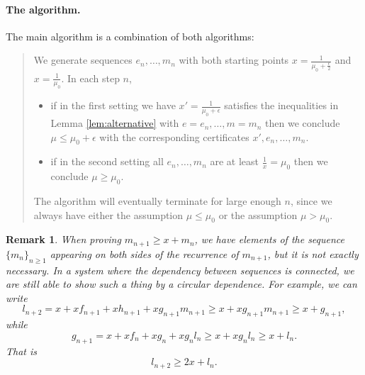 \documentclass[a4paper,12pt]{article}
\newtheorem{remark}{Remark}
\begin{document}
\paragraph{The algorithm.}The main algorithm is a combination of both algorithms:
\begin{quote}
We generate sequences $e_n,\dots,m_n$ with both starting points $x=\frac{1}{\mu_0+\frac{\epsilon}{2}}$ and $x=\frac{1}{\mu_0}$. In each step $n$,
\begin{itemize}
    \item if in the first setting we have $x'=\frac{1}{\mu_0+\epsilon}$ satisfies the inequalities in Lemma \ref{lem:alternative} with $e=e_n,\dots,m=m_n$ then we conclude $\mu\le \mu_0+\epsilon$ with the corresponding certificates $x',e_n,\dots,m_n$.
    \item if in the second setting all $e_n,\dots,m_n$ are at least $\frac{1}{x} = \mu_0$ then we conclude $\mu\ge \mu_0$.
\end{itemize}
The algorithm will eventually terminate for large enough $n$, since we always have either the assumption $\mu\le \mu_0$ or the assumption $\mu>\mu_0$.
\end{quote}

\begin{remark}
    When proving $m_{n+1}\ge x+m_n$, we have elements of the sequence $\{m_n\}_{n\ge 1}$ appearing on both sides of the recurrence of $m_{n+1}$, but it is not exactly necessary. In a system where the dependency between sequences is connected, we are still able to show such a thing by a circular dependence. For example, we can write
    \[
   	    l_{n+2} = x + x f_{n+1} + x h_{n+1} + x g_{n+1} m_{n+1} \ge x + xg_{n+1}m_{n+1}\ge x + g_{n+1},
    \]
    while
    \[
    	g_{n+1} = x + x f_n + x g_n + x g_n l_n \ge x+xg_nl_n\ge x + l_n.
    \]
    That is
    \[
        l_{n+2}\ge 2x+l_n.
    \]
\end{remark}
\end{document}
